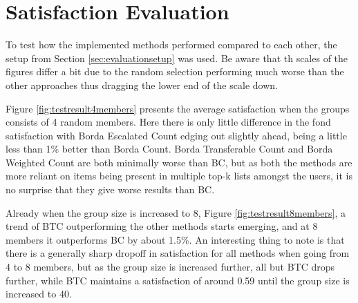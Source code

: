 \section{Satisfaction Evaluation} \label{sec:satisfationevaluation}

To test how the implemented methods performed compared to each other, the setup from Section \ref{sec:evaluationsetup} was used. Be aware that th scales of the figures differ a bit due to the random selection performing much worse than the other approaches thus dragging the lower end of the scale down.

Figure \ref{fig:testresult4members} presents the average satisfaction when the groups consists of 4 random members. Here there is only little difference in the fond satisfaction with Borda Escalated Count edging out slightly ahead, being a little less than 1\% better than Borda Count. Borda Transferable Count and Borda Weighted Count are both minimally worse than BC, but as both the methods are more reliant on items being present in multiple top-k lists amongst the users, it is no surprise that they give worse results than BC. 

Already when the group size is increased to 8, Figure \ref{fig:testresult8members}, a trend of BTC outperforming the other methods starts emerging, and at 8 members it outperforms BC by about 1.5\%. An interesting thing to note is that there is a generally sharp dropoff in satisfaction for all methods when going from 4 to 8 members, but as the group size is increased further, all but BTC drops further, while BTC maintains a satisfaction of around 0.59 until the group size is increased to 40.


